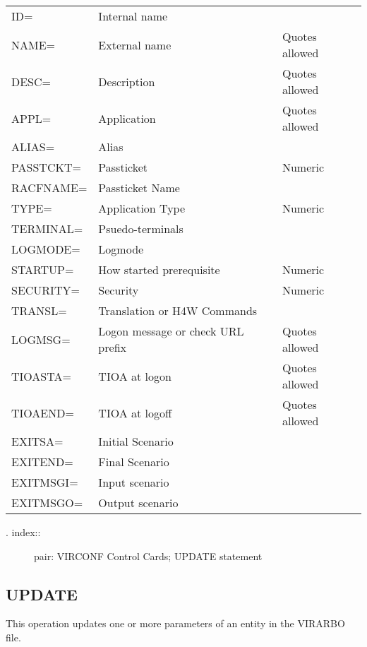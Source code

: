 \documentclass[letterpaper,10pt,english]{sphinxmanual}
\begin{document}
\begin{savenotes}\sphinxattablestart
\centering
\begin{tabulary}{\linewidth}[t]{|T|T|T|}
\hline
{}\relax &\relax &\relax \\
\hline
ID=
&
Internal name
&\\
\hline
NAME=
&
External name
&
Quotes allowed
\\
\hline
DESC=
&
Description
&
Quotes allowed
\\
\hline
APPL=
&
Application
&
Quotes allowed
\\
\hline
ALIAS=
&
Alias
&\\
\hline
PASSTCKT=
&
Passticket
&
Numeric
\\
\hline
RACFNAME=
&
Passticket Name
&\\
\hline
TYPE=
&
Application Type
&
Numeric
\\
\hline
TERMINAL=
&
Psuedo-terminals
&\\
\hline
LOGMODE=
&
Logmode
&\\
\hline
STARTUP=
&
How started
prerequisite
&
Numeric
\\
\hline
SECURITY=
&
Security
&
Numeric
\\
\hline
TRANSL=
&
Translation or H4W
Commands
&\\
\hline
LOGMSG=
&
Logon message or
check URL prefix
&
Quotes allowed
\\
\hline
TIOASTA=
&
TIOA at logon
&
Quotes allowed
\\
\hline
TIOAEND=
&
TIOA at logoff
&
Quotes allowed
\\
\hline
EXITSA=
&
Initial Scenario
&\\
\hline
EXITEND=
&
Final Scenario
&\\
\hline
EXITMSGI=
&
Input scenario
&\\
\hline
EXITMSGO=
&
Output scenario
&\\
\hline
\end{tabulary}
\par
\sphinxattableend\end{savenotes}
\begin{description}
\item[{. index::}] \leavevmode
pair: VIRCONF Control Cards; UPDATE statement

\end{description}


\subsection{UPDATE}
\label{\detokenize{Installation_Guide:update}}
This operation updates one or more parameters of an entity in the VIRARBO file.
\end{document}
